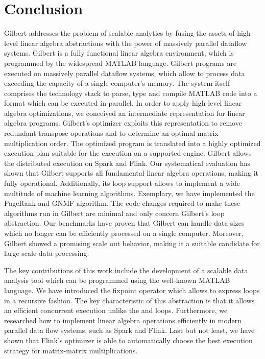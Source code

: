 \section{Conclusion}
\label{sec:conclusion}

Gilbert addresses the problem of scalable analytics by fusing the assets of high-level linear algebra abstractions with the power of massively parallel dataflow systems. 
Gilbert is a fully functional linear algebra environment, which is programmed by the widespread MATLAB language. 
Gilbert programs are executed on massively parallel dataflow systems, which allow to process data exceeding the capacity of a single computer's memory. 
The system itself comprises the technology stack to parse, type and compile MATLAB code into a format which can be executed in parallel. 
In order to apply high-level linear algebra optimizations, we conceived an intermediate representation for linear algebra programs. 
Gilbert's optimizer exploits this representation to remove redundant transpose operations and to determine an optimal matrix multiplication order. 
The optimized program is translated into a highly optimized execution plan suitable for the execution on a supported engine. 
Gilbert allows the distributed execution on Spark and Flink. Our systematical evaluation has shown that Gilbert supports all fundamental linear algebra operations, making it fully operational.
Additionally, its loop support allows to implement a wide multitude of machine learning algorithms.
Exemplary, we have implemented the PageRank and GNMF algorithm.
The code changes required to make these algorithms run in Gilbert are minimal and only concern Gilbert's loop abstraction.
Our benchmarks have proven that Gilbert can handle data sizes which no longer can be efficiently processed on a single computer.
Moreover, Gilbert showed a promising scale out behavior, making it a suitable candidate for large-scale data processing.

The key contributions of this work include the development of a scalable data analysis tool which can be programmed using the well-known MATLAB language. 
We have introduced the fixpoint operator which allows to express loops in a recursive fashion. 
The key characteristic of this abstraction is that it allows an efficient concurrent execution unlike the  and  loops. 
Furthermore, we researched how to implement linear algebra operations efficiently in modern parallel data flow systems, such as Spark and Flink. 
Last but not least, we have shown that Flink's optimizer is able to automatically choose the best execution strategy for matrix-matrix multiplications. 

